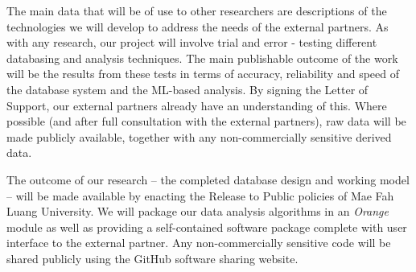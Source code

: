 \documentclass[11pt]{article}
\begin{document}
  \vspace{2mm}
  \noindent
  The main data that will be of use to other researchers are descriptions of the technologies we will develop to address the needs of the external partners. As with any research, our project will involve trial and error - testing different databasing and analysis techniques. The main publishable outcome of the work will be the results from these tests in terms of accuracy, reliability and speed of the database system and the ML-based analysis. By signing the Letter of Support, our external partners already have an understanding of this. Where possible (and after full consultation with the external partners), raw data will be made publicly available, together with any non-commercially sensitive derived data.
  
  \vspace{2mm}
  \noindent
   The outcome of our research  -- the completed database design and working model -- will be made available by enacting the Release to Public policies of Mae Fah Luang University. We will package our data analysis algorithms in an {\it Orange} module as well as providing a self-contained software package complete with user interface to the external partner. Any non-commercially sensitive code will be shared publicly using the GitHub software sharing website.
  
  
  
  
  
\end{document}
